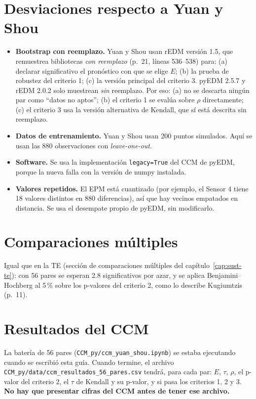 \documentclass[11pt,openany]{book}
\newcommand{\archivo}[1]{\texttt{\small #1}}
\begin{document}
\section{Desviaciones respecto a Yuan y Shou}

\begin{ojo}
\begin{itemize}
\item \textbf{Bootstrap con reemplazo.} Yuan y Shou usan rEDM versión 1.5, que remuestrea bibliotecas \emph{con reemplazo} (p.~21, líneas 536--538) para: (a) declarar significativo el pronóstico con que se elige $E$; (b) la prueba de robustez del criterio 1; (c) la versión principal del criterio 3. pyEDM 2.5.7 y rEDM 2.0.2 solo muestrean \emph{sin} reemplazo. Por eso: (a) no se descarta ningún par como ``datos no aptos''; (b) el criterio 1 se evalúa sobre $\rho$ directamente; (c) el criterio 3 usa la versión alternativa de Kendall, que sí está descrita sin reemplazo.
\item \textbf{Datos de entrenamiento.} Yuan y Shou usan 200 puntos simulados. Aquí se usan las 880 observaciones con \emph{leave-one-out}.
\item \textbf{Software.} Se usa la implementación \texttt{legacy=True} del CCM de pyEDM, porque la nueva falla con la versión de numpy instalada.
\item \textbf{Valores repetidos.} El EPM está cuantizado (por ejemplo, el Sensor 4 tiene 18 valores distintos en 880 diferencias), así que hay vecinos empatados en distancia. Se usa el desempate propio de pyEDM, sin modificarlo.
\end{itemize}
\end{ojo}

\section{Comparaciones múltiples}

Igual que en la TE (sección de comparaciones múltiples del capítulo~\ref{cap:sust-te}): con 56 pares se esperan 2.8 significativos por azar, y se aplica Benjamini--Hochberg al 5\,\% sobre los p-valores del criterio 2, como lo describe Kugiumtzis (p.~11).

\section{Resultados del CCM}

\begin{ojo}[Pendiente]
La batería de 56 pares (\archivo{CCM\_py/ccm\_yuan\_shou.ipynb}) se estaba ejecutando cuando se escribió esta guía. Cuando termine, el archivo \archivo{CCM\_py/data/ccm\_resultados\_56\_pares.csv} tendrá, para cada par: $E$, $\tau$, $\rho$, el p-valor del criterio 2, el $\tau$ de Kendall y su p-valor, y si pasa los criterios 1, 2 y 3. \textbf{No hay que presentar cifras del CCM antes de tener ese archivo.}
\end{ojo}
\end{document}
